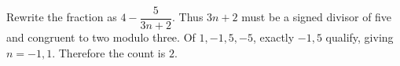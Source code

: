 Rewrite the fraction as $4-\dfrac{5}{3n+2}$. Thus $3n+2$ must be a signed divisor of five and congruent to two modulo three. Of $1,-1,5,-5$, exactly $-1,5$ qualify, giving $n=-1,1$. Therefore the count is $\boxed2$.
